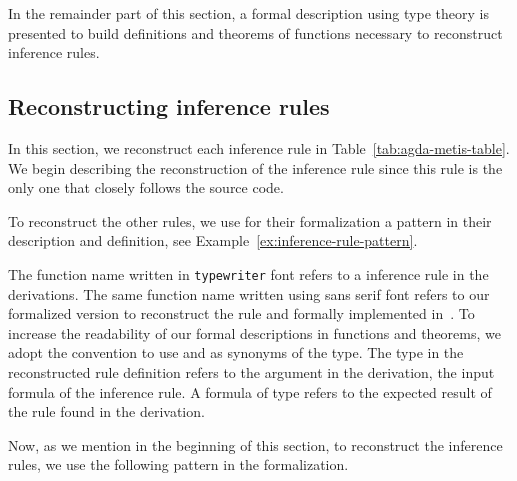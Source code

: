 \documentclass[../main.tex]{subfiles}
\begin{document}
In the remainder part of this section, a formal description using
type theory is presented to build definitions and theorems of
functions necessary to reconstruct \Metis inference rules.


\subsection{Reconstructing \Metis inference rules}
\label{ssec:emulating-inferences}

In this section, we reconstruct each \Metis inference rule in
Table~\ref{tab:agda-metis-table}.
We begin describing the reconstruction of the \strip inference rule
since this rule  is the only one that closely follows the \Metis
source code.

To reconstruct the other rules, we use for their formalization
a pattern in their description and definition,
see Example~\ref{ex:inference-rule-pattern}.

\begin{notation}
  The function name written in \texttt{typewriter} font refers to a
  \Metis inference rule in the \TSTP derivations. The same function
  name written using
  \textsf{sans serif} font refers to our formalized version to
  reconstruct the rule and formally implemented in~\cite{AgdaMetis}.
  To increase the readability of our formal descriptions in
  functions and theorems, we adopt
  the convention to use \Source and \Target as synonyms of the \Prop
  type. The \Source type in the reconstructed rule definition refers
  to the argument in the \TSTP derivation, \ie the input formula of
  the inference rule. A formula of \Target type refers to the
  expected result of the rule found in the \TSTP derivation.
\end{notation}



Now, as we mention in the beginning of this section, to reconstruct
the \Metis inference rules, we use the following pattern in
the formalization.
\end{document}
